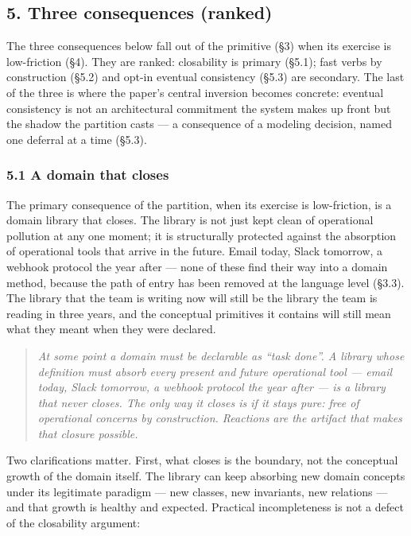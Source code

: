 \documentclass[
]{article}
\newcounter{none} %
\begin{document}
\subsection{5. Three consequences
(ranked)}\label{three-consequences-ranked}

The three consequences below fall out of the primitive (§3) when its
exercise is low-friction (§4). They are ranked: closability is primary
(§5.1); fast verbs by construction (§5.2) and opt-in eventual
consistency (§5.3) are secondary. The last of the three is where the
paper's central inversion becomes concrete: eventual consistency is not
an architectural commitment the system makes up front but the shadow the
partition casts --- a consequence of a modeling decision, named one
deferral at a time (§5.3).

\subsubsection{5.1 A domain that closes}\label{a-domain-that-closes}

The primary consequence of the partition, when its exercise is
low-friction, is a domain library that closes. The library is not just
kept clean of operational pollution at any one moment; it is
structurally protected against the absorption of operational tools that
arrive in the future. Email today, Slack tomorrow, a webhook protocol
the year after --- none of these find their way into a domain method,
because the path of entry has been removed at the language level (§3.3).
The library that the team is writing now will still be the library the
team is reading in three years, and the conceptual primitives it
contains will still mean what they meant when they were declared.

\begin{quote}
\emph{At some point a domain must be declarable as ``task done''. A
library whose definition must absorb every present and future
operational tool --- email today, Slack tomorrow, a webhook protocol the
year after --- is a library that never closes. The only way it closes is
if it stays pure: free of operational concerns by construction.
Reactions are the artifact that makes that closure possible.}
\end{quote}

Two clarifications matter. First, what closes is the boundary, not the
conceptual growth of the domain itself. The library can keep absorbing
new domain concepts under its legitimate paradigm --- new classes, new
invariants, new relations --- and that growth is healthy and expected.
Practical incompleteness is not a defect of the closability argument:
\end{document}
